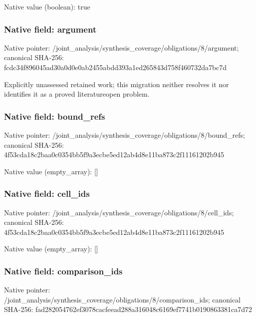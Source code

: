 \documentclass[10pt,a4paper]{article}
\begin{document}
Native value (boolean): true



\subsubsection{Native field: argument}


Native pointer: /joint\_analysis/synthesi\allowbreak{}s\_coverage/obligations/8\allowbreak{}/argument; canonical SHA-256: fcdc34f896045ad30a0d0e0a\allowbreak{}b2455abdd393a1ed265843d7\allowbreak{}58f460732da7bc7d


Explicitly unassessed retained work; this migration neither resolves it nor identifies it as a proved literatureopen problem.


\subsubsection{Native field: bound\_refs}


Native pointer: /joint\_analysis/synthesi\allowbreak{}s\_coverage/obligations/8\allowbreak{}/bound\_refs; canonical SHA-256: 4f53cda18c2baa0c0354bb5f\allowbreak{}9a3ecbe5ed12ab4d8e11ba87\allowbreak{}3c2f11161202b945



Native value (empty\_array): []



\subsubsection{Native field: cell\_ids}


Native pointer: /joint\_analysis/synthesi\allowbreak{}s\_coverage/obligations/8\allowbreak{}/cell\_ids; canonical SHA-256: 4f53cda18c2baa0c0354bb5f\allowbreak{}9a3ecbe5ed12ab4d8e11ba87\allowbreak{}3c2f11161202b945



Native value (empty\_array): []



\subsubsection{Native field: comparison\_ids}


Native pointer: /joint\_analysis/synthesi\allowbreak{}s\_coverage/obligations/8\allowbreak{}/comparison\_ids; canonical SHA-256: fad282054762ef3078cacfee\allowbreak{}ad288a316048c6169ef7741b\allowbreak{}0190863381ca7d72
\end{document}

